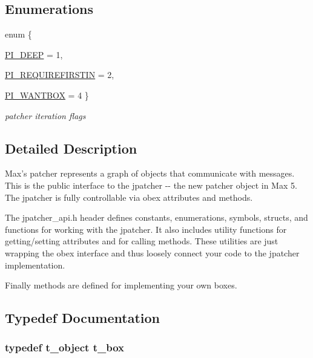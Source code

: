 \subsection*{Enumerations}
\begin{DoxyCompactItemize}
\item 
enum \{ \par
\hyperlink{group__patcher_ggabc6126af1d45847bc59afa0aa3216b04a615ccc19640c4714e619315b94765e48}{PI\_\-DEEP} =  1, 
\par
\hyperlink{group__patcher_ggabc6126af1d45847bc59afa0aa3216b04a4c42ad2b13496b1d6664fed514724ffa}{PI\_\-REQUIREFIRSTIN} =  2, 
\par
\hyperlink{group__patcher_ggabc6126af1d45847bc59afa0aa3216b04a128de369dd62c2625aff042d820456eb}{PI\_\-WANTBOX} =  4
 \}
\begin{DoxyCompactList}\small\item\em patcher iteration flags \item\end{DoxyCompactList}\end{DoxyCompactItemize}


\subsection{Detailed Description}
Max's patcher represents a graph of objects that communicate with messages. This is the public interface to the jpatcher -\/-\/ the new patcher object in Max 5. The jpatcher is fully controllable via obex attributes and methods.

The jpatcher\_\-api.h header defines constants, enumerations, symbols, structs, and functions for working with the jpatcher. It also includes utility functions for getting/setting attributes and for calling methods. These utilities are just wrapping the obex interface and thus loosely connect your code to the jpatcher implementation.

Finally methods are defined for implementing your own boxes. 

\subsection{Typedef Documentation}
\hypertarget{group__patcher_ga4ae1309e71747dc0dc5c2baba5e47bc9}{
\subsubsection[{t\_\-box}]{\setlength{\rightskip}{0pt plus 5cm}typedef {\bf t\_\-object} {\bf t\_\-box}}}
\label{group__patcher_ga4ae1309e71747dc0dc5c2baba5e47bc9}


